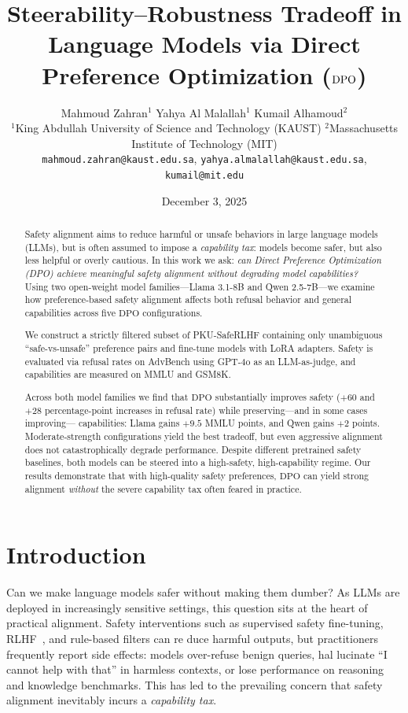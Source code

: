 \documentclass[a4paper, twocolumn, 9pt]{article}
\title{\vspace{-1.5cm}\textbf{Steerability–Robustness Tradeoff in Language Models via Direct Preference Optimization ($\text{DPO}$)}\vspace{0.5cm}}
\author{
    Mahmoud Zahran$^1$ \quad Yahya Al Malallah$^1$ \quad Kumail Alhamoud$^2$ \\
    \small $^1$King Abdullah University of Science and Technology (KAUST) \quad
    $^2$Massachusetts Institute of Technology (MIT) \\
    \small \texttt{mahmoud.zahran@kaust.edu.sa}, \texttt{yahya.almalallah@kaust.edu.sa}, \texttt{kumail@mit.edu}
}
\date{December 3, 2025}
\newcommand{\DPO}{\text{DPO}}
\begin{document}
\maketitle

\begin{abstract}
Safety alignment aims to reduce harmful or unsafe behaviors in large language models (LLMs),
but is often assumed to impose a \emph{capability tax}: models become safer, but also less helpful
or overly cautious.
In this work we ask: \emph{can Direct Preference Optimization (DPO) achieve meaningful safety alignment
without degrading model capabilities?}
Using two open-weight model families---Llama 3.1-8B and Qwen 2.5-7B---we examine how preference-based
safety alignment affects both refusal behavior and general capabilities across five $\DPO$ configurations.

We construct a strictly filtered subset of PKU-SafeRLHF containing only unambiguous ``safe-vs-unsafe''
preference pairs and fine-tune models with LoRA adapters.
Safety is evaluated via refusal rates on AdvBench using GPT-4o as an LLM-as-judge,
and capabilities are measured on MMLU and GSM8K.

Across both model families we find that $\DPO$ substantially improves safety
(\(+60\) and \(+28\) percentage-point increases in refusal rate) while preserving---and in some cases improving---
capabilities: Llama gains \(+9.5\) MMLU points, and Qwen gains \(+2\) points.
Moderate-strength configurations yield the best tradeoff, but even aggressive alignment
does not catastrophically degrade performance.
Despite different pretrained safety baselines, both models can be steered into a high-safety, high-capability regime.
Our results demonstrate that with high-quality safety preferences, $\DPO$ can yield strong alignment \emph{without}
the severe capability tax often feared in practice.
\end{abstract}

\section{Introduction}

Can we make language models safer without making
them dumber? As LLMs are deployed in increasingly
sensitive settings, this question sits at the heart of practical
alignment. Safety interventions such as supervised
safety fine-tuning, RLHF~\cite{rlhf}, and rule-based filters can re
duce harmful outputs, but practitioners frequently report
side effects: models over-refuse benign queries, hal
lucinate ``I cannot help with that'' in harmless contexts,
or lose performance on reasoning and knowledge benchmarks.
This has led to the prevailing concern that safety
alignment inevitably incurs a \emph{capability tax}.
\end{document}
